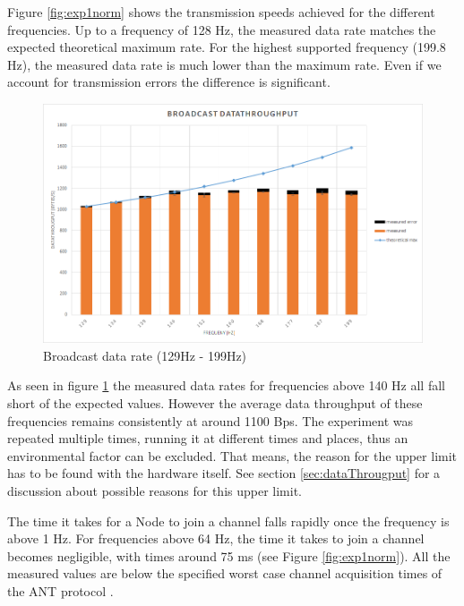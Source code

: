 \begin{description}
	Figure \ref{fig:exp1norm} shows the transmission speeds achieved for the different frequencies. Up to a frequency of 128 Hz, the measured data rate matches the expected theoretical maximum rate. For the highest supported frequency (199.8 Hz), the measured data rate is much lower than the maximum rate. Even if we account for transmission errors the difference is significant. 
		\begin{figure}[H]
			\centering
			\includegraphics[scale=0.5]{./pics/exp1_detail.png}
			\caption{Broadcast data rate (129Hz - 199Hz)}\label{fig:exp1between}
		\end{figure}
	As seen in figure \ref{fig:exp1between} the measured data rates for frequencies above 140 Hz all fall short of the expected values. However the average data throughput of these frequencies remains consistently at around 1100 Bps. The experiment was repeated multiple times, running it at different times and places, thus an environmental factor can be excluded. That means, the reason for the upper limit has to be found with the hardware itself. See section \ref{sec:dataThrougput} for a discussion about possible reasons for this upper limit.
	
	The time it takes for a Node to join a channel falls rapidly once the frequency is above 1 Hz. For frequencies above 64 Hz, the time it takes to join a channel becomes negligible, with times around 75 ms (see Figure \ref{fig:exp1norm}). All the measured values are below the specified worst case channel acquisition times of the ANT protocol \cite{AntChan}.
	

\end{description}
